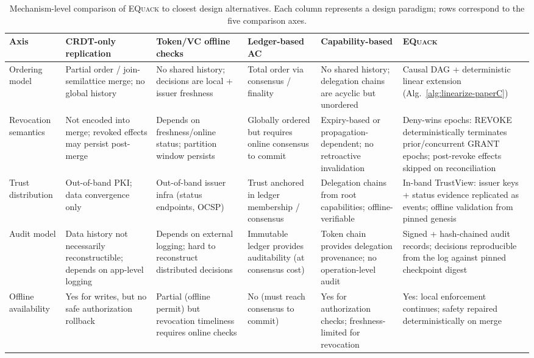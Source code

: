\documentclass[10pt,journal,compsoc]{IEEEtran}
\newcommand{\equack}{\textsc{EQuack}}
\begin{document}
\begin{table}[t]
\centering
\caption{Mechanism-level comparison of \equack{} to closest design alternatives. Each column represents a design paradigm; rows correspond to the five comparison axes.}
\label{tab:mech-compare}
\footnotesize
\setlength{\tabcolsep}{4pt}
\renewcommand{\arraystretch}{1.25}
\begin{tabular}{p{1.6cm} p{2.4cm} p{2.4cm} p{2.4cm} p{2.4cm} p{3.0cm}}
\toprule
\textbf{Axis} & \textbf{CRDT-only replication} & \textbf{Token/VC offline checks} & \textbf{Ledger-based AC} & \textbf{Capability-based} & \textbf{\equack{}} \\
\midrule
Ordering model &
  Partial order / join-semilattice merge; no global history &
  No shared history; decisions are local + issuer freshness &
  Total order via consensus / finality &
  No shared history; delegation chains are acyclic but unordered &
  Causal DAG + deterministic linear extension (Alg.~\ref{alg:linearize-paperC}) \\
\addlinespace
Revocation semantics &
  Not encoded into merge; revoked effects may persist post-merge &
  Depends on freshness/online status; partition window persists &
  Globally ordered but requires online consensus to commit &
  Expiry-based or propagation-dependent; no retroactive invalidation &
  Deny-wins epochs: REVOKE deterministically terminates prior/concurrent GRANT epochs; post-revoke effects skipped on reconciliation \\
\addlinespace
Trust distribution &
  Out-of-band PKI; data convergence only &
  Out-of-band issuer infra (status endpoints, OCSP) &
  Trust anchored in ledger membership / consensus &
  Delegation chains from root capabilities; offline-verifiable &
  In-band TrustView: issuer keys + status evidence replicated as events; offline validation from pinned genesis \\
\addlinespace
Audit model &
  Data history not necessarily reconstructible; depends on app-level logging &
  Depends on external logging; hard to reconstruct distributed decisions &
  Immutable ledger provides auditability (at consensus cost) &
  Token chain provides delegation provenance; no operation-level audit &
  Signed + hash-chained audit records; decisions reproducible from the log against pinned checkpoint digest \\
\addlinespace
Offline availability &
  Yes for writes, but no safe authorization rollback &
  Partial (offline permit) but revocation timeliness requires online checks &
  No (must reach consensus to commit) &
  Yes for authorization checks; freshness-limited for revocation &
  Yes: local enforcement continues; safety repaired deterministically on merge \\
\bottomrule
\end{tabular}
\end{table}
\end{document}
